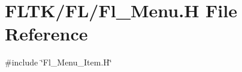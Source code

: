 \hypertarget{_fl___menu_8_h}{}\section{F\+L\+T\+K/\+F\+L/\+Fl\+\_\+\+Menu.H File Reference}
\label{_fl___menu_8_h}
{\ttfamily \#include \char`\"{}Fl\+\_\+\+Menu\+\_\+\+Item.\+H\char`\"{}}\newline
